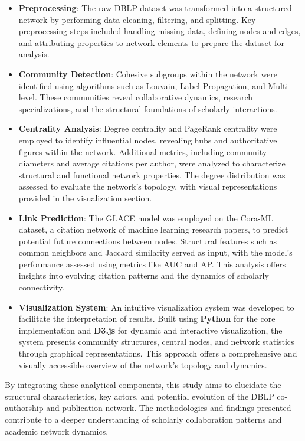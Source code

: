 \documentclass[11pt]{article}
\begin{document}
\begin{itemize}
	\item \textbf{Preprocessing}: The raw DBLP dataset was transformed into a structured network by performing data cleaning, filtering, and splitting. Key preprocessing steps included handling missing data, defining nodes and edges, and attributing properties to network elements to prepare the dataset for analysis.
	\item \textbf{Community Detection}: Cohesive subgroups within the network were identified using algorithms such as Louvain, Label Propagation, and Multi-level. These communities reveal collaborative dynamics, research specializations, and the structural foundations of scholarly interactions.
	\item \textbf{Centrality Analysis}: Degree centrality and PageRank centrality were employed to identify influential nodes, revealing hubs and authoritative figures within the network. Additional metrics, including community diameters and average citations per author, were analyzed to characterize structural and functional network properties. The degree distribution was assessed to evaluate the network's topology, with visual representations provided in the visualization section.
	\item \textbf{Link Prediction}: The GLACE model was employed on the Cora-ML dataset, a citation network of machine learning research papers, to predict potential future connections between nodes. Structural features such as common neighbors and Jaccard similarity served as input, with the model’s performance assessed using metrics like AUC and AP. This analysis offers insights into evolving citation patterns and the dynamics of scholarly connectivity.
	\item \textbf{Visualization System}: An intuitive visualization system was developed to facilitate the interpretation of results. Built using \textbf{Python} for the core implementation and \textbf{D3.js} for dynamic and interactive visualization, the system presents community structures, central nodes, and network statistics through graphical representations. This approach offers a comprehensive and visually accessible overview of the network's topology and dynamics.
\end{itemize}

By integrating these analytical components, this study aims to elucidate the structural characteristics, key actors, and potential evolution of the DBLP co-authorship and publication network. The methodologies and findings presented contribute to a deeper understanding of scholarly collaboration patterns and academic network dynamics.
\end{document}
